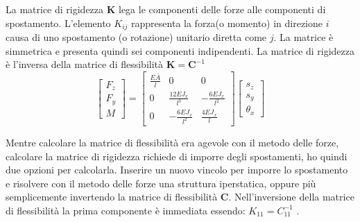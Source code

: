 \begin{definizioneBox}
    La matrice di rigidezza $\boldsymbol{K}$ lega le componenti delle forze alle componenti di spostamento. L'elemento $K_{ij} $ rappresenta la forza(o momento) in direzione $i$ causa di uno spostamento (o rotazione) unitario diretta come $j$. La matrice è simmetrica e presenta quindi sei componenti  indipendenti.
    La matrice di rigidezza è l'inversa della matrice di flessibilità $\boldsymbol{K}  = \boldsymbol{C}^{-1}$
    \begin{equation*}
    \begin{bmatrix}
F_z\\
F_y \\
M
\end{bmatrix}
=
\begin{bmatrix}
\frac{E\bar{A}}{l} & 0 & 0 \\
0 & \frac{12EJ_x}{l^3} & -\frac{6EJ_x}{l^2} \\
0 & -\frac{6EJ_x}{l^2} & \frac{4EJ_x}{l}
\end{bmatrix}
\begin{bmatrix}
s_z \\
s_y \\
\theta_x
\end{bmatrix}
\end{equation*}
\end{definizioneBox}

Mentre calcolare la matrice di flessibilità era agevole con il metodo delle forze, calcolare la matrice di rigidezza richiede di imporre degli spostamenti, ho quindi due opzioni per calcolarla. Inserire un nuovo vincolo per imporre lo spostamento e risolvere con il metodo delle forze una struttura iperstatica, oppure più semplicemente invertendo la matrice di flessibilità $\boldsymbol{C}$. Nell'inversione della matrice di flessibilità la prima componente è immediata essendo: $K_{11} = C_{11}^{-1}$ .

